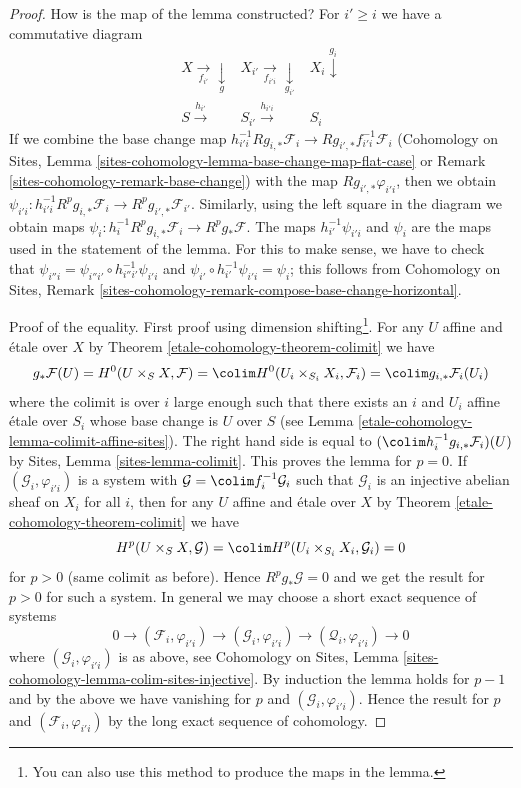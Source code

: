 \begin{proof}
How is the map of the lemma constructed?
For $i' \geq i$ we have a commutative diagram
$$
\begin{array}{ccc}X \underset{f_{i'}}{\longrightarrow}\underset{g}{\downarrow} & X_{i'} \underset{f_{i'i}}{\longrightarrow}\underset{g_{i'}}{\downarrow} & X_i \overset{g_i}{\downarrow} \\ S \overset{h_{i'}}{\longrightarrow} & S_{i'} \overset{h_{i'i}}{\longrightarrow} & S_i\end{array}
$$
If we combine the base change map
$h_{i'i}^{-1}Rg_{i, *}\mathcal{F}_i \to Rg_{i', *}f_{i'i}^{-1}\mathcal{F}_i$
(Cohomology on Sites, Lemma
\ref{sites-cohomology-lemma-base-change-map-flat-case} or
Remark \ref{sites-cohomology-remark-base-change})
with the map $Rg_{i', *}\varphi_{i'i}$, then we obtain
$\psi_{i'i} : h_{i' i}^{-1} R^p g_{i, *} \mathcal{F}_i \to
R^pg_{i', *} \mathcal{F}_{i'}$. Similarly, using the left square
in the diagram we obtain maps
$\psi_i : h_i^{-1}R^pg_{i, *}\mathcal{F}_i \to R^pg_*\mathcal{F}$.
The maps $h_{i'}^{-1}\psi_{i'i}$ and $\psi_i$ are the maps used in
the statement of the lemma. For this to make sense, we have to check that
$\psi_{i''i} = \psi_{i''i'} \circ h_{i''i'}^{-1}\psi_{i'i}$ and
$\psi_{i'} \circ h_{i'}^{-1}\psi_{i'i} = \psi_i$; this follows
from Cohomology on Sites, Remark
\ref{sites-cohomology-remark-compose-base-change-horizontal}.

\medskip\noindent
Proof of the equality. First proof using
dimension shifting\footnote{You can also use this method
to produce the maps in the lemma.}. For any
$U$ affine and \'etale over $X$ by Theorem \ref{etale-cohomology-theorem-colimit}
we have
$$
g_*\mathcal{F}(U) =
H^0(U \times_S X, \mathcal{F}) =
\colim H^0(U_i \times_{S_i} X_i, \mathcal{F}_i) =
\colim g_{i, *}\mathcal{F}_i(U_i)
$$
where the colimit is over $i$ large enough such that
there exists an $i$ and $U_i$ affine \'etale over $S_i$
whose base change is $U$ over $S$ (see
Lemma \ref{etale-cohomology-lemma-colimit-affine-sites}).
The right hand side is equal to
$(\colim h_i^{-1}g_{i, *}\mathcal{F}_i)(U)$ by
Sites, Lemma \ref{sites-lemma-colimit}.
This proves the lemma for $p = 0$.
If $(\mathcal{G}_i, \varphi_{i'i})$ is a system with
$\mathcal{G} = \colim f_i^{-1}\mathcal{G}_i$
such that $\mathcal{G}_i$ is an injective abelian sheaf on $X_i$
for all $i$, then for any $U$ affine and \'etale over $X$ by
Theorem \ref{etale-cohomology-theorem-colimit} we have
$$
H^p(U \times_S X, \mathcal{G}) =
\colim H^p(U_i \times_{S_i} X_i, \mathcal{G}_i) = 0
$$
for $p > 0$ (same colimit as before). Hence $R^pg_*\mathcal{G} = 0$
and we get the result for $p > 0$ for such a system.
In general we may choose a short exact sequence of systems
$$
0 \to (\mathcal{F}_i, \varphi_{i'i}) \to
(\mathcal{G}_i, \varphi_{i'i}) \to
(\mathcal{Q}_i, \varphi_{i'i}) \to 0
$$
where $(\mathcal{G}_i, \varphi_{i'i})$ is as above, see
Cohomology on Sites, Lemma
\ref{sites-cohomology-lemma-colim-sites-injective}.
By induction the lemma holds for $p - 1$ and by the above we have
vanishing for $p$ and $(\mathcal{G}_i, \varphi_{i'i})$.
Hence the result for $p$
and $(\mathcal{F}_i, \varphi_{i'i})$ by the long exact sequence
of cohomology.


\end{proof}
